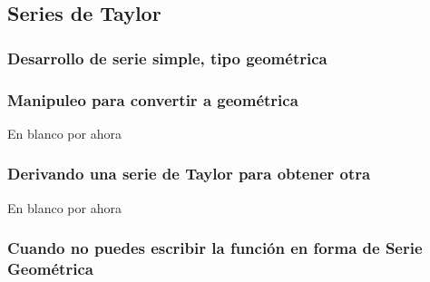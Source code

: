 \subsection{Series de Taylor}

\label{ex:taylor-series}

\subsubsection{Desarrollo de serie simple, tipo geométrica}


\subsubsection{Manipuleo para convertir a geométrica}
En blanco por ahora

\subsubsection{Derivando una serie de Taylor para obtener otra}
En blanco por ahora

\subsubsection{Cuando no puedes escribir la función en forma de Serie Geométrica}


